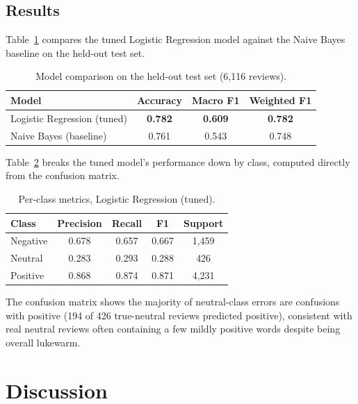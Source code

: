 \documentclass{article}
\begin{document}
\subsection{Results}

Table~\ref{tab:comparison} compares the tuned Logistic Regression model
against the Naive Bayes baseline on the held-out test set.

\begin{table}[t]
\centering
\caption{Model comparison on the held-out test set (6{,}116 reviews).}
\label{tab:comparison}
\begin{tabular}{lccc}
\toprule
Model & Accuracy & Macro F1 & Weighted F1 \\
\midrule
Logistic Regression (tuned) & \textbf{0.782} & \textbf{0.609} & \textbf{0.782} \\
Naive Bayes (baseline)      & 0.761          & 0.543          & 0.748 \\
\bottomrule
\end{tabular}
\end{table}

Table~\ref{tab:perclass} breaks the tuned model's performance down by class,
computed directly from the confusion matrix.

\begin{table}[t]
\centering
\caption{Per-class metrics, Logistic Regression (tuned).}
\label{tab:perclass}
\begin{tabular}{lcccc}
\toprule
Class & Precision & Recall & F1 & Support \\
\midrule
Negative & 0.678 & 0.657 & 0.667 & 1{,}459 \\
Neutral  & 0.283 & 0.293 & 0.288 & 426 \\
Positive & 0.868 & 0.874 & 0.871 & 4{,}231 \\
\bottomrule
\end{tabular}
\end{table}

The confusion matrix shows the majority of neutral-class errors are
confusions with positive (194 of 426 true-neutral reviews predicted
positive), consistent with real neutral reviews often containing a few
mildly positive words despite being overall lukewarm.

\section{Discussion}
\end{document}
